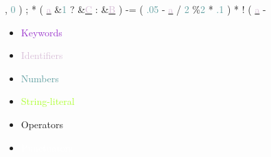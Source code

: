 \documentclass[usenames,dvipsnames]{beamer}
\begin{document}
\begin{frame}
, 
\textcolor{CadetBlue}{0} 
) 
; 
\textcolor{JungleGreen}{*} 
( 
\textcolor{black}{ } \newline 
\textcolor{black}{ } \newline 
\underline{\textcolor{Thistle}{a}} 
\textcolor{JungleGreen}{\&}\textcolor{CadetBlue}{1} 
? 
\textcolor{JungleGreen}{\&}\underline{\textcolor{Thistle}{C}} 
: 
\textcolor{JungleGreen}{\&}\underline{\textcolor{Thistle}{B}} 
) 
\textcolor{JungleGreen}{-=} 
( 
\textcolor{CadetBlue}{.05} 
\textcolor{black}{ } \newline 
\textcolor{black}{ } \newline 
\textcolor{JungleGreen}{-} 
\underline{\textcolor{Thistle}{a}} 
\textcolor{JungleGreen}{/} 
\textcolor{CadetBlue}{2} 
\textcolor{JungleGreen}{\%}\textcolor{CadetBlue}{2} 
\textcolor{JungleGreen}{*} 
\textcolor{CadetBlue}{.1} 
) 
\textcolor{JungleGreen}{*} 
\textcolor{JungleGreen}{!} 
( 
\underline{\textcolor{Thistle}{a}} 
\textcolor{JungleGreen}{-} 
\textcolor{black}{ } \newline 
\begin{multicols}{3} 
	 \begin{itemize} 
	 	 \item \textcolor{DarkOrchid}{Keywords} 
	 	 \item \textcolor{Thistle}{Identifiers} 
	 	 \item \textcolor{CadetBlue}{Numbers} 
	 	 \item \textcolor{GreenYellow}{String-literal} 
	 	 \item \textcolor{JungleGreen}{Operators} 
	 	 \item \textcolor{white}{Punctuators} 
	 \end{itemize} 
\end{multicols} 
\end{frame} 
 
\end{document}
